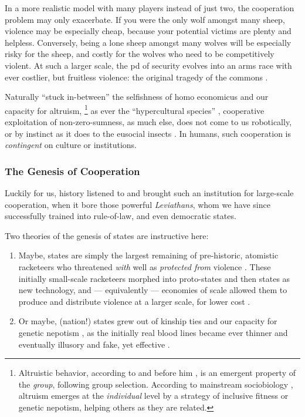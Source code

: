 In a more realistic model with many players instead of just two, the cooperation problem may only exacerbate.
If you were the only wolf amongst many sheep, violence may be especially cheap, because your potential victims are plenty and helpless.
Conversely, being a lone sheep amongst many wolves will be especially risky for the sheep, and costly for the wolves who need to be competitively violent.
At such a larger scale, the \gls{pd} of security evolves into an arms race with ever costlier, but fruitless violence:
the original tragedy of the commons \citep{Hardin-1968-aa}.

Naturally ``stuck in-between'' \citep{Lehrer2012} the selfishness of homo economicus and our capacity for altruism,
\footnote{
	Altruistic behavior, according to \cite{Wilson2012} and before him \cite{Darwin1859}, is an emergent property of the \emph{group}, following group selection.
	According to mainstream sociobiology \citep[and initially][]{Wilson1975}, altruism emerges at the \emph{individual} level by a strategy of inclusive fitness or genetic nepotism, helping others as they are related.
}
as ever the ``hypercultural species'' \citep[K175]{Henrich2007}, cooperative exploitation of non-zero-sumness, as much else, does not come to us robotically, or by instinct as it does to the eusocial insects \citep{Wilson2012}.
In humans, such cooperation is \emph{contingent} on culture or institutions.

\subsubsection{The Genesis of Cooperation}
Luckily for us, history listened to \citeauthor{Hobbes-1651-aa} and brought such an institution for large-scale cooperation, when it bore those powerful \emph{Leviathans}, whom we have since successfully trained into rule-of-law, and even democratic states.

Two theories of the genesis of states are instructive here:
\begin{enumerate}
	\item
	Maybe, states are simply the largest remaining of pre-historic, atomistic racketeers who threatened \emph{with} well as \emph{protected from} violence \citep[182]{Tilly-1985-aa}.
	These initially small-scale racketeers morphed into proto-states and then states as new technology, and --- equivalently --- economies of scale allowed them to produce and distribute violence at a larger scale, for lower cost \citep{Tilly-1985-aa}.

	\item
	Or maybe, (nation!) states grew out of kinship ties and our capacity for genetic nepotism \citep{Hamilton1964,Axelrod1981a}, as the initially real blood lines became ever thinner and eventually illusory and fake, yet effective \citep{Van-den-Berghe-1981-aa,Gellner-1983-aa}.
\end{enumerate}

